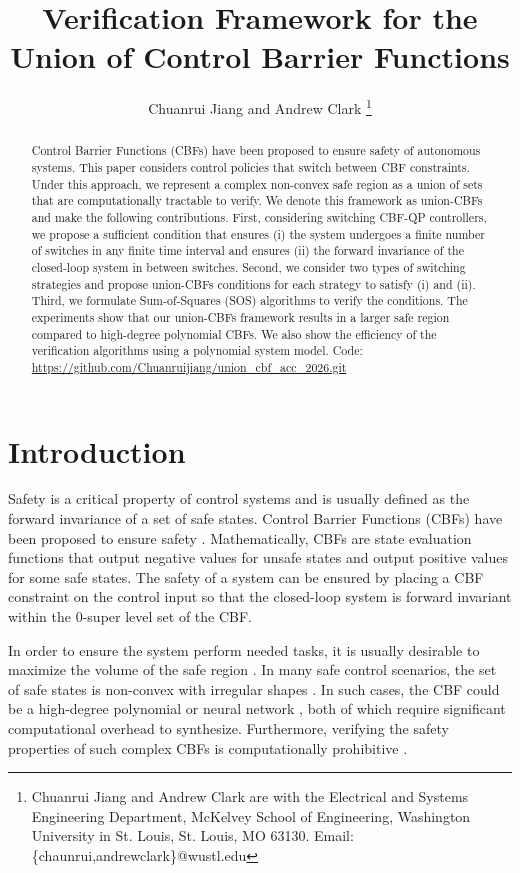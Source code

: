 \documentclass[letterpaper, 10 pt, conference]{ieeeconf}  %
\title{Verification Framework for the
Union of Control Barrier Functions
}
\author{
Chuanrui Jiang and Andrew Clark
%
\thanks{Chuanrui Jiang and Andrew Clark are with the Electrical and Systems Engineering Department, McKelvey School of Engineering, Washington University in St. Louis, St. Louis, MO 63130. Email: \{chaunrui,andrewclark\}@wustl.edu}
}
\begin{document}
\maketitle

\begin{abstract}
Control Barrier Functions (CBFs) have been proposed to ensure safety of autonomous systems. This paper considers control policies that switch between CBF constraints. Under this approach, we represent a complex non-convex safe region as a union of sets that are computationally tractable to verify. We denote this framework as union-CBFs and make the following contributions. First, considering switching CBF-QP controllers, we propose a sufficient condition that ensures (i) the system undergoes a finite number of switches in any finite time interval and ensures (ii) the forward invariance of the closed-loop system in between switches. Second, we consider two types of switching strategies and propose union-CBFs conditions for each strategy to satisfy (i) and (ii). Third, we formulate Sum-of-Squares (SOS) algorithms to verify the conditions. The experiments show that our union-CBFs framework results in a larger safe region compared to high-degree polynomial CBFs. We also show the efficiency of the verification algorithms using a polynomial system model. Code: \url{https://github.com/Chuanruijiang/union_cbf_acc_2026.git}
\end{abstract}
\section{Introduction}
\label{sec:intro}
 
Safety is a critical property of control systems and is usually defined as the forward invariance of a set of safe states\cite{franco2008set}. Control Barrier Functions (CBFs) have been proposed to ensure safety \cite{ames2016control, ames2019control}. Mathematically, CBFs are state evaluation functions that output negative values for unsafe states and output positive values for some safe states. The safety of a system can be ensured by placing a CBF constraint on the control input so that the closed-loop system is forward invariant within the 0-super level set of the CBF.

In order to ensure the system perform needed tasks, it is usually desirable to maximize the volume of the safe region \cite{srinivasan2020synthesis, dai2023convex, xiao2023barriernet}. In many safe control scenarios, the set of safe states is non-convex  with irregular shapes \cite{glotfelter2017nonsmooth, molnar2023composing}. In such cases, the CBF could be a high-degree polynomial \cite{wang2024safe} or neural network \cite{jin2020neural, robey2020learning, dawson2023safe}, both of which require significant computational overhead to synthesize. Furthermore, verifying the safety properties of such complex CBFs is computationally prohibitive \cite{zhang2023exact}.
\end{document}
